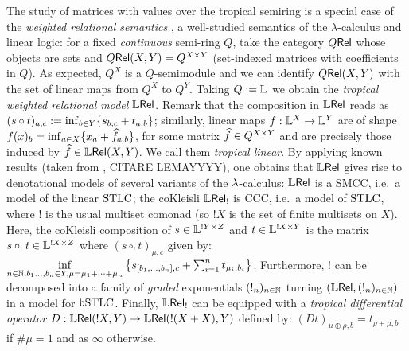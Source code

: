 \documentclass[submission,%
]{eptcs}
\begin{document}
The study of matrices with values over the tropical semiring is a special case of the
\emph{weighted relational semantics} \cite{Manzo2013}, a well-studied semantics of the $\lambda$-calculus and linear logic:
for a fixed \emph{continuous} semi-ring $Q$, take the category $Q \mathsf{Rel}$ whose objects are sets and ${Q \mathsf{Rel}}(X,Y)=Q^{X\times Y}$ (set-indexed matrices with coefficients in $Q$). %
As expected, $Q^X$ is a $Q$-semimodule and we can identify ${Q \mathsf{Rel}}(X,Y)$ with the set of linear maps from $Q^X$ to $Q^Y$.
Taking $Q:=\mathbb{L}$ we obtain the \emph{tropical weighted relational model} $\mathbb{L} \mathsf{Rel}$.
Remark that the composition in $\mathbb{L} \mathsf{Rel}$ %
reads as \ $(s\circ t)_{a,c}:=\inf_{b\in Y}\{s_{b,c}+t_{a,b}\}$;
similarly, linear maps $f:\mathbb{L}^X\to \mathbb{L}^Y$ are of shape $f(x)_b=\inf_{a\in X} \{x_a+\widehat{f}_{a,b}\}$, for some matrix $\widehat{f}\in Q^{X\times Y}$ and are precisely those induced by $\widehat{f}\in{\mathbb{L}\mathsf{Rel}}(X,Y)$. We call them \emph{tropical linear}.
By applying known results (taken from \cite{Manzo2013},  {\color{red}CITARE LEMAYYYY}), one obtains that $\mathbb{L} \mathsf{Rel}$ gives rise to denotational models of several variants of the $\lambda$-calculus:
$\mathbb{L} \mathsf{Rel}$ is a SMCC, i.e.\ a model of the linear $\mathrm{STLC}$;
the coKleisli $\mathbb{L} \mathsf{Rel}_!$ is CCC, i.e.\ a model of $\mathrm{STLC}$, where $!$ is the usual multiset comonad (so $!X$ is the set of finite multisets on $X$).
Here, the coKleisli composition of $s\in\mathbb{L}^{!Y\times Z}$ and $t\in\mathbb{L}^{!X\times Y}$ is the matrix $s\circ_! t\in\mathbb{L}^{!X\times Z}$ where $(s\circ_! t)_{\mu,c}$ given by:
$
 \inf\limits_{n\in\mathbb{N}, b_1\dots,b_n\in Y, \mu = \mu_1+\cdots +\mu_n}
 \left\{s_{[b_1,\dots,b_n],c} + \sum_{i=1}^n t_{\mu_i,b_i}\right\}$.
Furthermore, $!$ can be decomposed into a family of \emph{graded} exponentials $(!_n)_{n\in\mathbb{N}}$ turning $(\mathbb{L} \mathsf{Rel},(!_n)_{n\in\mathbb{N}})$ in a model for $\mathsf b\mathrm{STLC}$. 
Finally, $\mathbb{L} \mathsf{Rel}_!$ can be equipped with a \emph{tropical differential operator} $D:{\mathbb{L} \mathsf{Rel}}(!X,Y)\to {\mathbb{L}\mathsf{Rel}}(!(X+X),Y)$ defined by: $(Dt)_{\mu\oplus\rho,b}=t_{\rho+\mu,b}$ if $\#\mu=1$ and as $\infty$ otherwise. %
\end{document}

